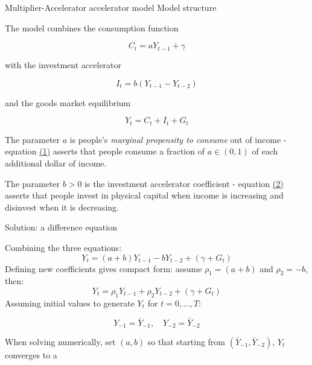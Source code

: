 \documentclass{beamer}
\newcommand{\tb}[1]{{\color{blue}{\textbf{#1}}}}
\newenvironment{mytemize}
{\vfill\itemize[nolistsep,itemsep=\fill,label=\color{blue}{$\triangleright$}]}
  {\enditemize}
\begin{document}
\begin{frame}{Multiplier-Accelerator accelerator model}{ Model structure}

The model combines the consumption function

 \[
C_t = a Y_{t-1} + \gamma \tag{1}
\]

with the investment accelerator

 \[
I_t = b (Y_{t-1} - Y_{t-2}) \tag{2}
\]

and the goods market equilibrium

 \[
Y_t = C_t + I_t + G_t \tag{3}
\]

\begin{mytemize}
 
\item
  The parameter $a$ is people's \emph{marginal propensity to consume}
  out of income - equation
  \protect\hyperlink{equation-consumption}{(1)} asserts that people
  consume a fraction of \(a \in (0,1)\) of each additional dollar of
  income.\\
\item
  The parameter \(b > 0\) is the investment accelerator coefficient -
  equation \protect\hyperlink{equation-accelerator}{(2)} asserts that
  people invest in physical capital when income is increasing and
  disinvest when it is decreasing.
\end{mytemize}

\end{frame}

\begin{frame}{Solution: a difference equation}

  Combining the three equations:
  $$
Y_t = (a+b) Y_{t-1} - b Y_{t-2} + (\gamma + G_t)
$$
\vfill
Defining new coefficients gives compact form: assume $\rho_1 = (a+b)$ and $\rho_2 = -b$, then:
$$
Y_t = \rho_1 Y_{t-1} + \rho_2 Y_{t-2} + (\gamma + G_t) 
$$
\vfill
Assuming initial values to generate ${Y_t}$ for $ t=0, \ldots, T $:

$$
Y_{-1} = \bar Y_{-1}, \quad  Y_{-2} = \bar Y_{-2}
$$

When solving numerically, set $(a,b) $ so that starting from
$(\bar Y_{-1}, \bar Y_{-2})$,  ${Y_t}$ converges to
a \tb{steady state}

\end{frame}
\end{document}
